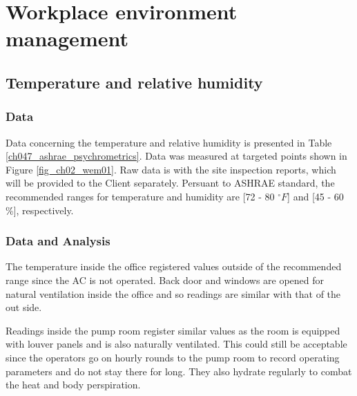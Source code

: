 
\section{Workplace environment management}
\label{47}

\subsection{Temperature and relative humidity}
\subsubsection{Data}
Data concerning the temperature and relative humidity is presented in Table \ref{ch047_ashrae_psychrometrics}. Data was measured at targeted points shown in Figure \ref{fig_ch02_wem01}. Raw data is with the site inspection reports, which will be provided to the Client separately. Persuant to ASHRAE standard, the recommended ranges for temperature and humidity are [72 - 80 $^\circ F$] and [45 - 60 \%], respectively.

\subsubsection{Data and Analysis}



The temperature inside the office registered values outside of the recommended range since the AC is not operated. Back door and windows are opened for natural ventilation inside the office and so readings are similar with that of the out side.

Readings inside the pump room register similar values as the room is equipped with louver panels and is also naturally ventilated. This could still be acceptable since the operators go on hourly rounds to the pump room to record operating parameters and do not stay there for long. They also hydrate regularly to combat the heat and body perspiration. 

